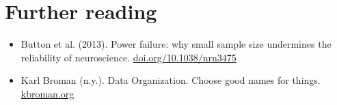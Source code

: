 \documentclass{article}
\begin{document}
\section{Further reading}\label{further-reading}


\begin{itemize}
\item Button et al. (2013). Power failure: why small sample size undermines the reliability of neuroscience. \href{https://doi.org/10.1038/nrn3475}{doi.org/10.1038/nrn3475}


\item Karl Broman (n.y.). Data Organization. Choose good names for things. \href{http://kbroman.org/dataorg/pages/names.html}{kbroman.org}


\end{itemize}
\end{document}
